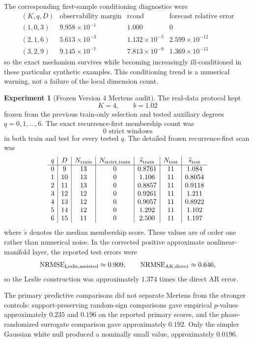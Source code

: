 \documentclass[11pt]{amsart}
\numberwithin{equation}{section}
\theoremstyle{plain}
\theoremstyle{definition}
\newtheorem{experiment}[theorem]{Experiment}
\theoremstyle{remark}
\begin{document}
The corresponding first-sample conditioning diagnostics were
\[
\begin{array}{c|c|c|c}
(K,q,D) & \text{observability margin} & \operatorname{rcond} & \text{forecast relative error}\\
\hline
(1,0,3) & 9.958\times10^{-1} & 1.000 & 0\\
(2,1,6) & 5.613\times10^{-3} & 1.132\times10^{-5} & 2.599\times10^{-12}\\
(3,2,9) & 9.145\times10^{-7} & 7.813\times10^{-9} & 1.369\times10^{-15}
\end{array}
\]
so the exact mechanism survives while becoming increasingly ill-conditioned in these particular
synthetic examples.  This conditioning trend is a numerical warning, not a failure of the local
dimension count.

\begin{experiment}[Frozen Version 4 Mertens audit]
\label{exp:v4_frozen}
The real-data protocol kept
\[
K=4,\qquad b=1.02
\]
frozen from the previous train-only selection and tested auxiliary degrees
$q=0,1,\ldots,6$.  The exact recurrence-first membership count was
\[
\boxed{0\text{ strict windows}}
\]
in both train and test for every tested $q$.  The detailed frozen recurrence-first scan was
\[
\begin{array}{c|c|c|c|c|c|c}
q&D&N_{\rm train}&N_{\rm strict,train}&\widetilde s_{\rm train}
&N_{\rm test}&\widetilde s_{\rm test}\\
\hline
0& 9&13&0&0.8761&11&1.084\\
1&10&13&0&1.106 &11&0.8054\\
2&11&13&0&0.8857&11&0.9118\\
3&12&12&0&0.9261&11&1.211\\
4&13&12&0&0.9057&11&0.8922\\
5&14&12&0&1.292 &11&1.102\\
6&15&11&0&2.500 &11&1.197
\end{array}
\]
where $\widetilde s$ denotes the median membership score.  These values are of order one rather
than numerical noise.  In the corrected positive approximate nonlinear-manifold layer,
the reported test errors were
\[
\operatorname{NRMSE}_{\rm Leslie,assisted}\approx0.909,
\qquad
\operatorname{NRMSE}_{\rm AR,direct}\approx0.646,
\]
so the Leslie construction was approximately $1.374$ times the direct AR error.

The primary predictive comparisons did not separate Mertens from the stronger controls:
support-preserving random-sign comparisons gave empirical $p$-values approximately $0.235$ and
$0.196$ on the reported primary scores, and the phase-randomized surrogate comparison gave
approximately $0.192$.  Only the simpler Gaussian white null produced a nominally small value,
approximately $0.0196$.
\end{experiment}
\end{document}
